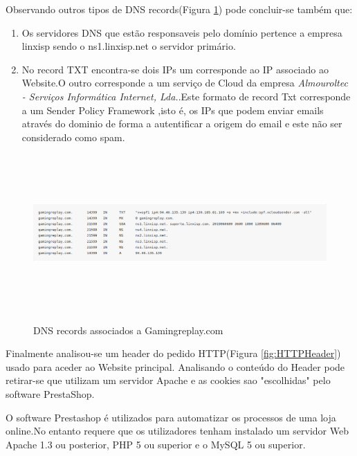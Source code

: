 Observando outros tipos de DNS records(Figura \ref{fig:DNSRecords}) pode concluir-se também que:

\begin{enumerate}

\item Os servidores DNS que estão responsaveis pelo domínio pertence a empresa linxisp sendo o ns1.linxisp.net o servidor primário.
\newline
\item No record TXT encontra-se dois IPs um corresponde ao IP associado ao Website.O outro corresponde a um serviço de Cloud da empresa \emph{Almouroltec - Serviços Informática Internet, Lda.}.Este formato de record Txt corresponde a um Sender Policy Framework ,isto é, os IPs que podem enviar emails através do dominio de forma a autentificar a origem do email e este não ser considerado como spam.

\end{enumerate}

\begin{figure}[h!]
\caption{DNS records associados a Gamingreplay.com}
\centering
\includegraphics[width=\textwidth,height=6cm,keepaspectratio]{Images/DNSRecords.png}
\label{fig:DNSRecords}
\end{figure}

Finalmente analisou-se um header do pedido HTTP(Figura \ref{fig:HTTPHeader}) usado para aceder ao Website principal. Analisando o conteúdo do Header pode retirar-se que utilizam um servidor Apache e as cookies sao "escolhidas" pelo software PrestaShop.

O software Prestashop é utilizados para automatizar os processos de uma loja online.No entanto requere que os utilizadores tenham instalado um servidor Web Apache 1.3 ou posterior, PHP 5 ou superior e o MySQL 5 ou superior.

